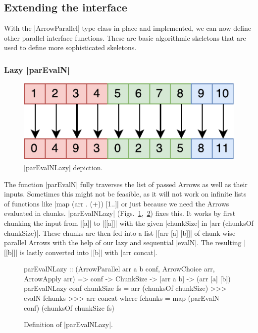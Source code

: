 \subsection{Extending the interface}
\label{sec:extending-interface}
With the |ArrowParallel| type class in place and implemented, we can now define other parallel interface functions. These are basic algorithmic skeletons that are used to define more sophisticated  skeletons.

\subsubsection{Lazy |parEvalN|}
\begin{figure}[tb]
	\includegraphics[scale=0.7]{images/parEvalNLazy}
	\caption{|parEvalNLazy| depiction.}
	\label{fig:parEvalNLazyImg}
\end{figure}
The function |parEvalN| fully traverses the list of passed Arrows as well as their inputs. Sometimes this might not be feasible, as it will not work on infinite lists of functions like \eg |map (arr . (+)) [1..]| or just because we need the Arrows evaluated in chunks. |parEvalNLazy| (Figs.~\ref{fig:parEvalNLazyImg},~\ref{fig:parEvalNLazy}) fixes this. It works by first chunking the input from |[a]| to |[[a]]| with the given |chunkSize| in |arr (chunksOf chunkSize)|. These chunks are then fed into a list |[arr [a] [b]]| of chunk-wise parallel Arrows with the help of our lazy and sequential |evalN|. The resulting |[[b]]| is lastly converted into |[b]| with |arr concat|.
\begin{figure}[t]
\begin{code}
parEvalNLazy :: (ArrowParallel arr a b conf, ArrowChoice arr, ArrowApply arr) =>
	conf -> ChunkSize -> [arr a b] -> (arr [a] [b])
parEvalNLazy conf chunkSize fs =
	arr (chunksOf chunkSize) >>>
    evalN fchunks >>>
    arr concat
    where
      fchunks = map (parEvalN conf) (chunksOf chunkSize fs)
\end{code} %
\caption{Definition of |parEvalNLazy|.}
\label{fig:parEvalNLazy}
\end{figure}

